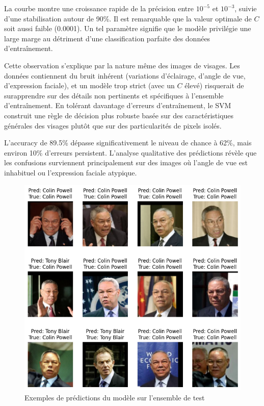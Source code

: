 \documentclass[11pt,a4paper]{article}
\begin{document}
La courbe montre une croissance rapide de la précision entre $10^{-5}$ et $10^{-3}$, suivie d'une stabilisation autour de 90\%. Il est remarquable que la valeur optimale de $C$ soit aussi faible (0.0001). Un tel paramètre signifie que le modèle privilégie une large marge au détriment d'une classification parfaite des données d'entraînement.

Cette observation s'explique par la nature même des images de visages. Les données contiennent du bruit inhérent (variations d'éclairage, d'angle de vue, d'expression faciale), et un modèle trop strict (avec un $C$ élevé) risquerait de surapprendre sur des détails non pertinents et spécifiques à l'ensemble d'entraînement. En tolérant davantage d'erreurs d'entraînement, le SVM construit une règle de décision plus robuste basée sur des caractéristiques générales des visages plutôt que sur des particularités de pixels isolés.

L'accuracy de 89.5\% dépasse significativement le niveau de chance à 62\%, mais environ 10\% d'erreurs persistent. L'analyse qualitative des prédictions révèle que les confusions surviennent principalement sur des images où l'angle de vue est inhabituel ou l'expression faciale atypique.

\begin{figure}[H]
\centering
\includegraphics[width=\textwidth]{images/3.png}
\caption{Exemples de prédictions du modèle sur l'ensemble de test}
\end{figure}
\end{document}
